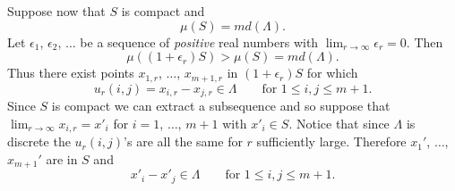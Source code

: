 Suppose now that $S$ is compact and
\[ \mu(S) = md(\Lambda) . \]
Let $\epsilon_1$, $\epsilon_2$, $\dots$ be a sequence of \emph{positive} real numbers with $\lim_{r\to\infty}\epsilon_r=0$.  Then
\[ \mu((1+\epsilon_r)S) > \mu(S) = md(\Lambda) . \]
Thus there exist points $x_{1,r}$, $\dotsc$, $x_{m+1,r}$ in $(1+\epsilon_r)S$ for which
\[ u_r(i,j) = x_{i,r} - x_{j,r} \in \Lambda \qquad \text{for $1\leq i,j\leq m+1$.} \]
Since $S$ is compact we can extract a subsequence and so suppose that $\lim_{r\to\infty}x_{i,r}=x'_i$ for $i=1$, $\dotsc$, $m+1$ with $x'_i\in S$.  Notice that since $\Lambda$ is discrete the $u_r(i,j)$'s are all the same for $r$ sufficiently large.  Therefore $x_1'$, $\dotsc$, $x_{m+1}'$ are in $S$ and
\[ x'_i - x'_j \in \Lambda \qquad \text{for $1\leq i,j\leq m+1$.} \]
